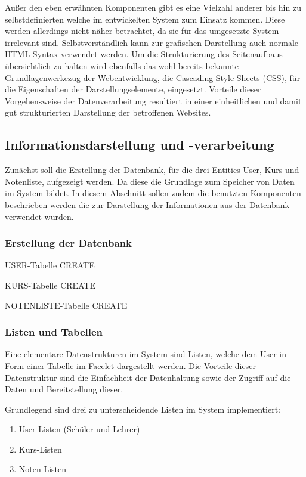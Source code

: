 Außer den eben erwähnten Komponenten gibt es eine Vielzahl anderer bis hin zu selbstdefinierten welche im entwickelten System zum Einsatz kommen. Diese werden allerdings nicht näher betrachtet, da sie für das umgesetzte System irrelevant sind. Selbstverständlich kann zur grafischen Darstellung auch normale \ac{HTML}-Syntax verwendet werden.
Um die Strukturierung des Seitenaufbaus übersichtlich zu halten wird ebenfalls das wohl bereits bekannte Grundlagenwerkezug der Webentwicklung, die \gls{Cascading Style Sheets} (CSS), für die Eigenschaften der Darstellungselemente, eingesetzt.
Vorteile dieser Vorgehensweise der Datenverarbeitung resultiert in einer einheitlichen und damit gut strukturierten Darstellung der betroffenen Websites.

\subsection{Informationsdarstellung und -verarbeitung}

Zunächst soll die Erstellung der Datenbank, für die drei Entities User, Kurs und Notenliste, aufgezeigt werden. Da diese die Grundlage zum Speicher von Daten im System bildet.
In diesem Abschnitt sollen zudem die benutzten Komponenten beschrieben werden die zur Darstellung der Informationen aus der Datenbank verwendet wurden.

\subsubsection{Erstellung der Datenbank}

USER-Tabelle
	CREATE

KURS-Tabelle
	CREATE

NOTENLISTE-Tabelle
	CREATE
	

\subsubsection{Listen und Tabellen}

Eine elementare Datenstrukturen im System sind Listen, welche dem User in Form einer Tabelle im Facelet dargestellt werden.
Die Vorteile dieser Datenstruktur sind die Einfachheit der Datenhaltung sowie der Zugriff auf die Daten und Bereitstellung dieser.

Grundlegend sind drei zu unterscheidende Listen im System implementiert:
\begin{enumerate}
  \item User-Listen (Schüler und Lehrer)
  \item Kurs-Listen
  \item Noten-Listen
\end{enumerate}

